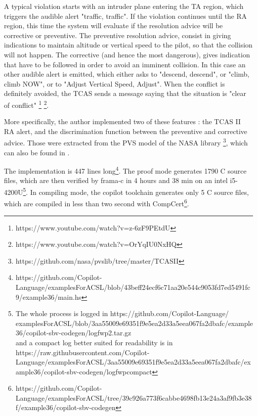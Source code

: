 \documentclass[a4paper,11pt,final]{article}
\begin{document}
	A typical violation starts with an intruder plane entering the TA region, which triggers the audible alert "traffic, traffic". If the violation continues until the RA region, this time the system will evaluate if the resolution advice will be corrective or preventive. The preventive resolution advice, consist in giving indications to maintain altitude or vertical speed to the pilot, so that the collision will not happen. The corrective (and hence the most dangerous), gives indication that have to be followed in order to avoid an imminent collision. In this case an other audible alert is emitted, which either asks to "descend, descend", or "climb, climb NOW", or to "Adjust Vertical Speed, Adjust". When the conflict is definitely avoided, the TCAS sends a message saying  that the situation is "clear of conflict" \footnote{https://www.youtube.com/watch?v=z-6zF9PEtdU} \footnote{https://www.youtube.com/watch?v=OrYqIU0NxHQ}.
	
	More specifically, the author implemented two of these features : the TCAS II RA alert, and the discrimination function between the preventive and corrective advice. Those were extracted from the PVS model of the NASA library \footnote{https://github.com/nasa/pvslib/tree/master/TCASII}, which can also be found in \cite{MNC13GNC}. 
	
	The implementation is 447 lines long\footnote{https://github.com/Copilot-Language/examplesForACSL/blob/43beff24ecf6c71aa20e544c9053fd7ed5491fc9/example36/main.hs}. The proof mode generates 1790 C source files, which are then verified by frama-c in 4 hours and 38 min on an intel i5-4200U\footnote{The whole process is logged in https://github.com/Copilot-Language/\\examplesForACSL/blob/3aa55009e69351f9e5ea2d33a5eea067fa2dbafc/example36/copilot-sbv-codegen/logfwp2.tar.gz \\ and a compact log better suited for readability is in https://raw.githubusercontent.com/Copilot-Language/examplesForACSL/3aa55009e69351f9e5ea2d33a5eea067fa2dbafc/example36/copilot-sbv-codegen/logfwpcompact}. In compiling mode, the copilot toolchain generates only 5 C source files, which are compiled in less than two second with CompCert\footnote{https://github.com/Copilot-Language/examplesForACSL/tree/39c926a773f6cabbe4698fb13e24a3af9fb3e38f/example36/copilot-sbv-codegen}.
	
\end{document}
